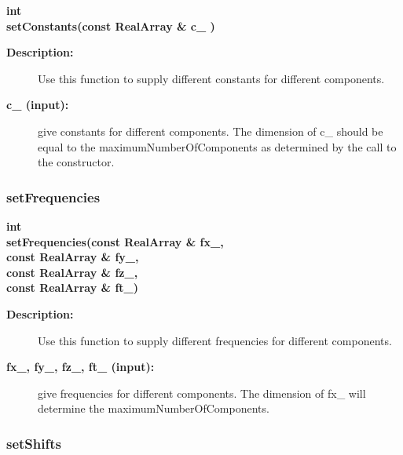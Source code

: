 \begin{flushleft} \textbf{%
int  \\ 
\settowidth{\OGTrigFunctionIncludeArgIndent}{setConstants(}%
setConstants(const RealArray \& c\_ )
}\end{flushleft}
\begin{description}
\item[{\bf Description:}]  
 
 Use this function to supply different constants for different components.

\item[{\bf c\_ (input):}]  give constants for different components. The dimension of c\_
   should be equal to the maximumNumberOfComponents as determined by the call to the constructor.

\end{description}
\subsubsection{setFrequencies}
 
\begin{flushleft} \textbf{%
int  \\ 
\settowidth{\OGTrigFunctionIncludeArgIndent}{setFrequencies(}%
setFrequencies(const RealArray \& fx\_, \\ 
\hspace{\OGTrigFunctionIncludeArgIndent}const RealArray \& fy\_, \\ 
\hspace{\OGTrigFunctionIncludeArgIndent}const RealArray \& fz\_, \\ 
\hspace{\OGTrigFunctionIncludeArgIndent}const RealArray \& ft\_)
}\end{flushleft}
\begin{description}
\item[{\bf Description:}]  
 
 Use this function to supply different frequencies for different components.

\item[{\bf fx\_, fy\_, fz\_, ft\_ (input):}]  give frequencies for different components. The dimension of fx\_
        will determine the maximumNumberOfComponents.

\end{description}
\subsubsection{setShifts}
 
